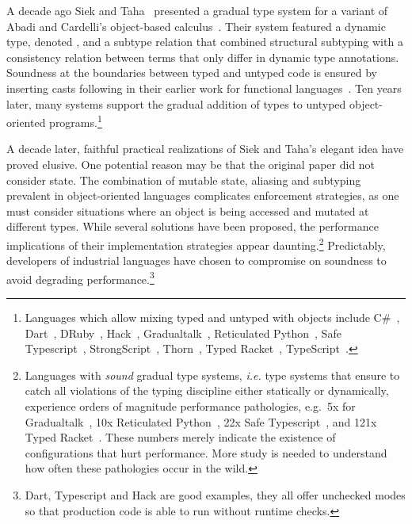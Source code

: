 \documentclass[acmlarge, anonymous, authordraft, review]{acmart} %
\begin{document}
\noindent A decade ago Siek and Taha~\cite{SiekTaha07} presented a gradual
type system for a variant of Abadi and Cardelli's object-based
calculus~\cite{cardelli:1996:theory-of-objects}. Their system featured a
dynamic type, denoted \any, and a subtype relation that combined structural
subtyping with a consistency relation between terms that only differ in
dynamic type annotations.  Soundness at the boundaries between typed and
untyped code is ensured by inserting casts following in their earlier work
for functional languages~\cite{SiekTaha06}.  Ten years later, many systems
support the gradual addition of types to untyped object-oriented
programs.\footnote{Languages which allow mixing typed and untyped with
  objects include
C\#~\cite{Bierman10},
Dart~\cite{dart13}, 
DRuby~\cite{FurrAF2009},
Hack~\cite{hack13}, 
Gradualtalk~\cite{GS13},
Reticulated Python~\cite{siek14}, 
Safe Typescript~\cite{safe-typescript},
StrongScript~\cite{ecoop15}, 
Thorn~\cite{oopsla09}, 
Typed Racket~\cite{Takikawa:2012}, 
TypeScript~\cite{BAT14}.}

A decade later, faithful practical realizations of Siek and Taha's elegant
idea have proved elusive. One potential reason may be that the original paper
did not consider state. The combination of mutable state, aliasing and
subtyping prevalent in object-oriented languages complicates enforcement
strategies, as one must consider situations where an object is being
accessed and mutated at different types. While several solutions have been
proposed, the performance implications of their implementation strategies
appear daunting.\footnote{Languages with \emph{sound} gradual type systems,
  \emph{i.e.} type systems that ensure to catch all violations of the typing
  discipline either statically or dynamically, experience orders of
  magnitude performance pathologies, e.g.~5x for
  Gradualtalk~\cite{allende13}, 10x Reticulated Python~\cite{siek14}, 22x
  Safe Typescript~\cite{safe-typescript}, and 121x Typed
  Racket~\cite{popl16}. These numbers merely indicate the existence of
  configurations that hurt performance. More study is needed to understand
  how often these pathologies occur in the wild.} Predictably, developers of
industrial languages have chosen to compromise on soundness to avoid
degrading performance.\footnote{Dart, Typescript and Hack are good examples,
  they all offer unchecked modes so that production code is able to run
  without runtime checks.}
\end{document}
